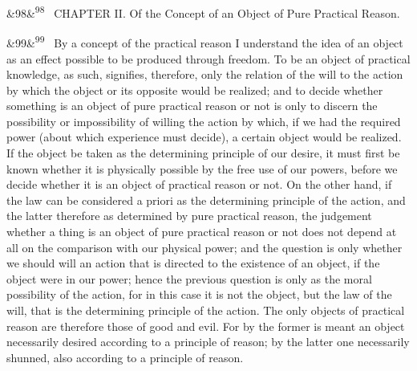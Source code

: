 \documentclass[12pt]{article}
\newcommand{\para}[1][]{\par\noindent\ifx&#1&\else\textsuperscript{\footnotesize #1}~\fi}
\begin{document}
\para[98] CHAPTER II. Of the Concept of an Object of Pure Practical Reason.

\para[99] By a concept of the practical reason I understand the idea of an object as an effect possible to be produced through freedom. To be an object of practical knowledge, as such, signifies, therefore, only the relation of the will to the action by which the object or its opposite would be realized; and to decide whether something is an object of pure practical reason or not is only to discern the possibility or impossibility of willing the action by which, if we had the required power (about which experience must decide), a certain object would be realized. If the object be taken as the determining principle of our desire, it must first be known whether it is physically possible by the free use of our powers, before we decide whether it is an object of practical reason or not. On the other hand, if the law can be considered a priori as the determining principle of the action, and the latter therefore as determined by pure practical reason, the judgement whether a thing is an object of pure practical reason or not does not depend at all on the comparison with our physical power; and the question is only whether we should will an action that is directed to the existence of an object, if the object were in our power; hence the previous question is only as the moral possibility of the action, for in this case it is not the object, but the law of the will, that is the determining principle of the action. The only objects of practical reason are therefore those of good and evil. For by the former is meant an object necessarily desired according to a principle of reason; by the latter one necessarily shunned, also according to a principle of reason.
\end{document}
